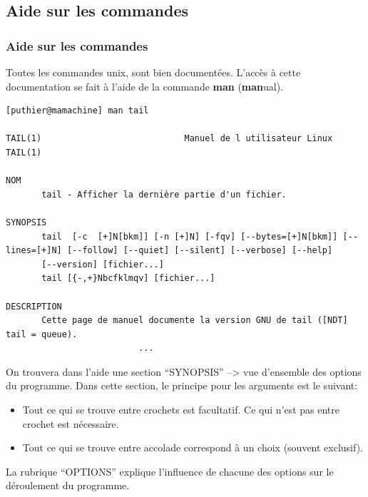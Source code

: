 \documentclass[10pt, xcolor=dvipsnames]{beamer}
\begin{document}


\subsection{Aide sur les commandes}

\begin{frame}[fragile]
    \frametitle{Aide sur les commandes}
    Toutes les commandes unix, sont bien documentées. L'accès à cette documentation se fait à l'aide de la commande \textbf{man} (\textbf{man}ual).
    \tiny    
    \begin{verbatim}
[puthier@mamachine] man tail

TAIL(1)                            Manuel de l utilisateur Linux                                             TAIL(1)

NOM
       tail - Afficher la dernière partie d'un fichier.

SYNOPSIS
       tail  [-c  [+]N[bkm]] [-n [+]N] [-fqv] [--bytes=[+]N[bkm]] [--lines=[+]N] [--follow] [--quiet] [--silent] [--verbose] [--help]
       [--version] [fichier...]
       tail [{-,+}Nbcfklmqv] [fichier...]

DESCRIPTION
       Cette page de manuel documente la version GNU de tail ([NDT] tail = queue).
                          ...
    \end{verbatim}
    \normalsize
\end{frame}



\begin{frame}[fragile]
    
    On trouvera dans l'aide une section ``SYNOPSIS'' --> vue d'ensemble des options du programme. Dans cette section, le principe pour les arguments est le suivant:
    \begin{itemize}
            \item Tout ce qui se trouve entre crochets est facultatif. Ce qui n'est pas entre crochet est nécessaire.
    
            \item Tout ce qui se trouve entre accolade correspond à un choix (souvent exclusif).
    \end{itemize}


    \vspace{0.8mm}
    La rubrique ``OPTIONS'' explique l'influence de chacune des options sur le déroulement du programme. 

\end{frame} 
\end{document}
